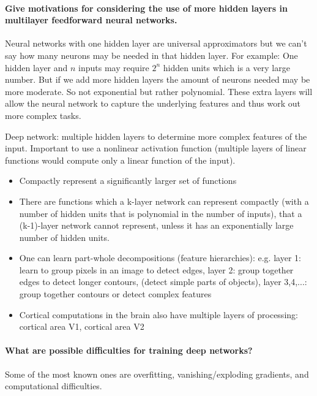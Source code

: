 \paragraph{Give motivations for considering the use of more hidden layers in multilayer feedforward neural networks.}

Neural networks with one hidden layer are universal approximators but we can't say how many
neurons may be needed in that hidden layer. For example: One hidden layer and $n$ inputs may require
$2^n$ hidden units which is a very large number. But if we add more hidden layers the amount of
neurons needed may be more moderate. So not exponential but rather polynomial. These extra
layers will allow the neural network to capture the underlying features and thus work out more
complex tasks.

Deep network: multiple hidden layers to determine more complex features of the input.
Important to use a nonlinear activation function (multiple layers of linear functions would compute only a linear function of the input).

\begin{itemize}
    \item Compactly represent a significantly larger set of functions
    \item There are functions which a k-layer network can represent compactly
        (with a number of hidden units that is polynomial in the number of
        inputs), that a (k-1)-layer network cannot represent, unless it has an
        exponentially large number of hidden units.
    \item One can learn part-whole decompositions (feature hierarchies): e.g.
        layer 1: learn to group pixels in an image to detect edges,
        layer 2: group together edges to detect longer contours,
        (detect simple parts of objects),
        layer 3,4,...: group together contours or detect complex features
    \item Cortical computations in the brain also have multiple layers of processing:
        cortical area V1,
        cortical area V2
\end{itemize}

\paragraph{What are possible difficulties for training deep networks?}

Some of the most known ones are overfitting, vanishing/exploding gradients, and computational difficulties.

